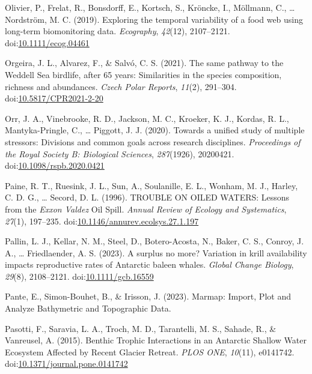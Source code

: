 \documentclass[
]{article}
\newlength{\cslhangindent}
\newlength{\cslentryspacingunit} %
\newenvironment{CSLReferences}[2] %
 {%
  \setlength{\parindent}{0pt}
  \ifodd #1
  \let\oldpar\par
  \def\par{\hangindent=\cslhangindent\oldpar}
  \fi
  \setlength{\parskip}{#2\cslentryspacingunit}
 }%
 {}
\begin{document}
\begin{CSLReferences}{1}{0}
\leavevmode{}%
Olivier, P., Frelat, R., Bonsdorff, E., Kortsch, S., Kröncke, I.,
Möllmann, C., \ldots{} Nordström, M. C. (2019). Exploring the temporal
variability of a food web using long-term biomonitoring data.
\emph{Ecography}, \emph{42}(12), 2107--2121.
doi:\href{https://doi.org/10.1111/ecog.04461}{10.1111/ecog.04461}

\leavevmode{}%
Orgeira, J. L., Alvarez, F., \& Salvó, C. S. (2021). The same pathway to
the {Weddell Sea} birdlife, after 65 years: Similarities in the species
composition, richness and abundances. \emph{Czech Polar Reports},
\emph{11}(2), 291--304.
doi:\href{https://doi.org/10.5817/CPR2021-2-20}{10.5817/CPR2021-2-20}

\leavevmode{}%
Orr, J. A., Vinebrooke, R. D., Jackson, M. C., Kroeker, K. J., Kordas,
R. L., Mantyka-Pringle, C., \ldots{} Piggott, J. J. (2020). Towards a
unified study of multiple stressors: Divisions and common goals across
research disciplines. \emph{Proceedings of the Royal Society B:
Biological Sciences}, \emph{287}(1926), 20200421.
doi:\href{https://doi.org/10.1098/rspb.2020.0421}{10.1098/rspb.2020.0421}

\leavevmode{}%
Paine, R. T., Ruesink, J. L., Sun, A., Soulanille, E. L., Wonham, M. J.,
Harley, C. D. G., \ldots{} Secord, D. L. (1996). {TROUBLE ON OILED
WATERS}: {Lessons} from the {\emph{Exxon Valdez}} {Oil Spill}.
\emph{Annual Review of Ecology and Systematics}, \emph{27}(1), 197--235.
doi:\href{https://doi.org/10.1146/annurev.ecolsys.27.1.197}{10.1146/annurev.ecolsys.27.1.197}

\leavevmode{}%
Pallin, L. J., Kellar, N. M., Steel, D., Botero-Acosta, N., Baker, C.
S., Conroy, J. A., \ldots{} Friedlaender, A. S. (2023). A surplus no
more? {Variation} in krill availability impacts reproductive rates of
{Antarctic} baleen whales. \emph{Global Change Biology}, \emph{29}(8),
2108--2121.
doi:\href{https://doi.org/10.1111/gcb.16559}{10.1111/gcb.16559}

\leavevmode{}%
Pante, E., Simon-Bouhet, B., \& Irisson, J. (2023). Marmap: {Import},
{Plot} and {Analyze Bathymetric} and {Topographic Data}.

\leavevmode{}%
Pasotti, F., Saravia, L. A., Troch, M. D., Tarantelli, M. S., Sahade,
R., \& Vanreusel, A. (2015). Benthic {Trophic Interactions} in an
{Antarctic Shallow Water Ecosystem Affected} by {Recent Glacier
Retreat}. \emph{PLOS ONE}, \emph{10}(11), e0141742.
doi:\href{https://doi.org/10.1371/journal.pone.0141742}{10.1371/journal.pone.0141742}


\end{CSLReferences}
\end{document}
